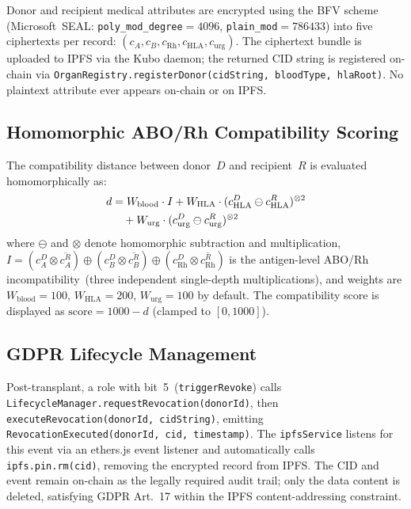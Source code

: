\documentclass[10pt,twocolumn,a4paper]{article}
\begin{document}
Donor and recipient medical attributes are encrypted using the BFV scheme
(Microsoft~SEAL: \texttt{poly\_mod\_degree}$=4096$, \texttt{plain\_mod}$=786433$)
into five ciphertexts per record: $(c_A, c_B, c_{\mathrm{Rh}}, c_{\mathrm{HLA}},
c_{\mathrm{urg}})$. The ciphertext bundle is uploaded to IPFS via the Kubo daemon;
the returned CID string is registered on-chain via
\texttt{OrganRegistry.registerDonor(cidString, bloodType, hlaRoot)}.
No plaintext attribute ever appears on-chain or on IPFS.

\subsection{Homomorphic ABO/Rh Compatibility Scoring}

The compatibility distance between donor~$D$ and recipient~$R$ is evaluated
homomorphically as:
\begin{align}
  d &= W_{\mathrm{blood}} \cdot I + W_{\mathrm{HLA}} \cdot (c_{\mathrm{HLA}}^D
      \ominus c_{\mathrm{HLA}}^R)^{\otimes 2} \notag\\
    &\quad + W_{\mathrm{urg}} \cdot (c_{\mathrm{urg}}^D \ominus c_{\mathrm{urg}}^R
      )^{\otimes 2}
  \label{eq:dist}
\end{align}
where $\ominus$ and $\otimes$ denote homomorphic subtraction and multiplication,
$I = (c_A^D \otimes \overline{c_A^R}) \oplus (c_B^D \otimes \overline{c_B^R})
\oplus (c_{\mathrm{Rh}}^D \otimes \overline{c_{\mathrm{Rh}}^R})$ is the
antigen-level ABO/Rh incompatibility~(three independent single-depth multiplications),
and weights are $W_{\mathrm{blood}}=100$, $W_{\mathrm{HLA}}=200$,
$W_{\mathrm{urg}}=100$ by default. The compatibility score is displayed as
$\mathrm{score} = 1000 - d$ (clamped to $[0,1000]$).

\subsection{GDPR Lifecycle Management}

Post-transplant, a role with bit~5~(\texttt{triggerRevoke}) calls
\texttt{LifecycleManager.requestRevocation(donorId)}, then
\texttt{executeRevocation(donorId, cidString)}, emitting
\texttt{RevocationExecuted(donorId, cid, timestamp)}. The \texttt{ipfsService}
listens for this event via an ethers.js event listener and automatically calls
\texttt{ipfs.pin.rm(cid)}, removing the encrypted record from IPFS. The CID
and event remain on-chain as the legally required audit trail; only the data content
is deleted, satisfying GDPR Art.~17 within the IPFS content-addressing constraint.
\end{document}
